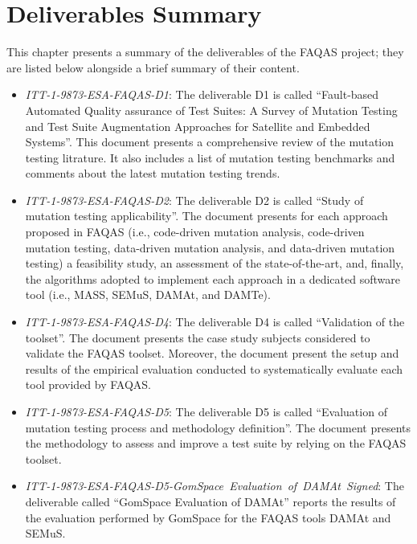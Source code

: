
\chapter{Deliverables Summary}

\label{chap:deliverables_summary}

This chapter presents a summary of the deliverables of the FAQAS project; they are listed below alongside a brief summary of their content.

\begin{itemize}
	\item \emph{ITT-1-9873-ESA-FAQAS-D1}: The deliverable D1 is called ``Fault-based Automated Quality assurance of Test Suites: A Survey of Mutation Testing and Test Suite Augmentation Approaches for Satellite and Embedded Systems''. This document presents a comprehensive review of the mutation testing litrature. It also includes a list of mutation testing benchmarks and comments about the latest mutation testing trends.

	\item \emph{ITT-1-9873-ESA-FAQAS-D2}: The deliverable D2 is called ``Study of mutation testing applicability''. The document presents for each approach proposed in FAQAS (i.e., code-driven mutation analysis, code-driven mutation testing, data-driven mutation analysis, and data-driven mutation testing) a feasibility study, an assessment of the state-of-the-art, and, finally, the algorithms adopted to implement each approach in a dedicated software tool (i.e., MASS, SEMuS, DAMAt, and DAMTe).

	\item \emph{ITT-1-9873-ESA-FAQAS-D4}: The deliverable D4 is called ``Validation of the toolset''. The document presents the case study subjects considered to validate the FAQAS toolset. Moreover, the document present the setup and results of the empirical evaluation conducted to systematically evaluate each tool provided by FAQAS.

	\item \emph{ITT-1-9873-ESA-FAQAS-D5}: The deliverable D5 is called ``Evaluation of mutation testing process and methodology definition''. The document presents the methodology to assess and improve a test suite by relying on the FAQAS toolset.

	\item \emph{ITT-1-9873-ESA-FAQAS-D5-GomSpace\ Evaluation\ of\ DAMAt\ Signed}: The deliverable called ``GomSpace Evaluation of DAMAt'' reports the results of the evaluation performed by GomSpace for the FAQAS tools DAMAt and SEMuS.


\end{itemize}
